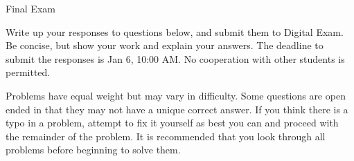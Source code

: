 \documentclass{article}
\newif\ifsolutions
\begin{document}
	
\ifsolutions\else

\fi

\begin{center}
	{\Huge Final Exam
	\ifsolutions (with Solutions) \fi}
\end{center}
\bigskip

\ifsolutions
The solutions below are meant to explain a possible way to solve the given problems and provide the final answer. They are not meant to present an answer that would receive maximal grade for each question.
\else
Write up your responses to questions below, and submit them to Digital Exam. Be concise, but show your work and explain your answers. The deadline to submit the responses is Jan 6, 10:00 AM. No cooperation with other students is permitted.

Problems have equal weight but may vary in difficulty.
Some questions are open ended in that they may not have a unique correct answer. If you think there is a typo in a problem, attempt to fix it yourself as best you can and proceed with the remainder of the problem. 
It is recommended that you look through all problems before beginning to solve them.
\fi


\end{document}
